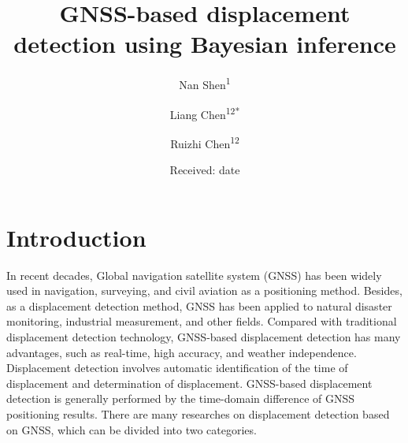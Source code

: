 \documentclass{svjour3}                     %
\begin{document}
\linenumbers
\title{GNSS-based displacement detection using Bayesian inference
}



\author{Nan Shen\textsuperscript{1}\and
		Liang Chen\textsuperscript{12*}\and        
		Ruizhi Chen\textsuperscript{12} %
}



\date{Received: date }


\maketitle

\begin{abstract}

\end{abstract}

\section{Introduction}
\label{intro}
In recent decades, Global navigation satellite system (GNSS) has been widely used in navigation, surveying, and civil aviation as a positioning method\citep{teunissen2017springer}. 
Besides, as a displacement detection method, GNSS has been applied to natural disaster monitoring\citep{awange2012environmental}, industrial measurement\citep{pavasovic2011application}, and other fields. 
Compared with traditional displacement detection technology, GNSS-based displacement detection has many advantages, such as real-time, high accuracy, and weather independence\citep{shen2019a}. 
Displacement detection involves automatic identification of the time of displacement and determination of displacement. 
GNSS-based displacement detection is generally performed by the time-domain difference of GNSS positioning results. There are many researches on displacement detection based on GNSS, which can be divided into two categories.
\end{document}
